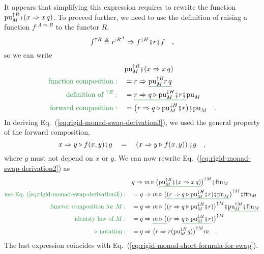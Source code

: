 It appears that simplifying this expression requires to rewrite the
function $\text{pu}_{M}^{\uparrow R}\bef(x\Rightarrow x\,q)$. To
proceed further, we need to use the definition of raising a function
$f^{:A\Rightarrow B}$ to the functor $R$,
\[
f^{\uparrow R}\triangleq r^{:R^{A}}\Rightarrow f^{\downarrow H}\bef r\bef f\quad,
\]
so we can write
\begin{align}
 & \text{pu}_{M}^{\uparrow R}\bef(x\Rightarrow x\,q)\nonumber \\
{\color{greenunder}\text{function composition}:}\quad & =r\Rightarrow\gunderline{\text{pu}_{M}^{\uparrow R}r\,q}\nonumber \\
{\color{greenunder}\text{definition of }^{\uparrow R}:}\quad & =\gunderline{r\Rightarrow q\triangleright\text{pu}_{M}^{\downarrow H}\bef r\bef}\text{pu}_{M}\nonumber \\
{\color{greenunder}\text{forward composition}:}\quad & =\big(r\Rightarrow q\triangleright\text{pu}_{M}^{\downarrow H}\bef r\big)\bef\text{pu}_{M}\quad.\label{eq:rigid-monad-swap-derivation3}
\end{align}
In deriving Eq.~(\ref{eq:rigid-monad-swap-derivation3}), we used
the general property of the forward composition,
\[
x\Rightarrow y\triangleright f(x,y)\bef g\quad=\quad\left(x\Rightarrow y\triangleright f(x,y)\right)\bef g\quad,
\]
where $g$ must not depend on $x$ or $y$. We can now rewrite Eq.~(\ref{eq:rigid-monad-swap-derivation2})
as
\begin{align*}
 & q\Rightarrow m\triangleright\big(\gunderline{\text{pu}_{M}^{\uparrow R}\bef(x\Rightarrow x\,q)}\big)^{\uparrow M}\bef\text{ftn}_{M}\\
{\color{greenunder}\text{use Eq.~(\ref{eq:rigid-monad-swap-derivation3})}:}\quad & =q\Rightarrow m\triangleright\big(\gunderline{(r\Rightarrow q\triangleright\text{pu}_{M}^{\downarrow H}\bef r)\bef\text{pu}_{M}}\big)^{\uparrow M}\bef\text{ftn}_{M}\\
{\color{greenunder}\text{functor composition for }M:}\quad & =q\Rightarrow m\triangleright\big((r\Rightarrow q\triangleright\text{pu}_{M}^{\downarrow H}\bef r)\big)^{\uparrow M}\bef\gunderline{\text{pu}_{M}^{\uparrow M}\bef\text{ftn}_{M}}\\
{\color{greenunder}\text{identity law of }M:}\quad & =q\Rightarrow\gunderline{m\triangleright\big(}(r\Rightarrow\gunderline{q\triangleright\text{pu}_{M}^{\downarrow H}\bef r})\big)^{\uparrow M}\\
{\color{greenunder}\triangleright\text{ notation}:}\quad & =q\Rightarrow\big(r\Rightarrow r(\text{pu}_{M}^{\downarrow H}q)\big)^{\uparrow M}m\quad.
\end{align*}
The last expression coincides with Eq.~(\ref{eq:rigid-monad-short-formula-for-swap}).

